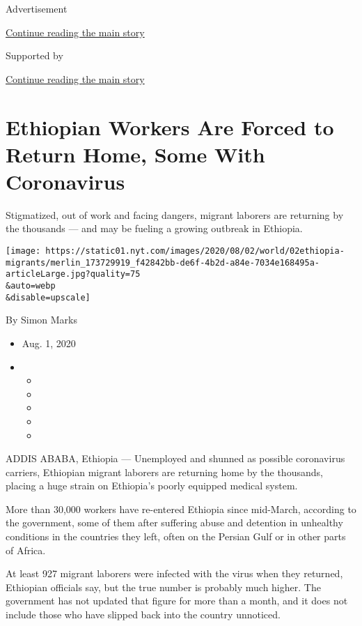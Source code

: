 Advertisement

\protect\hyperlink{after-top}{Continue reading the main story}

Supported by

\protect\hyperlink{after-sponsor}{Continue reading the main story}

\hypertarget{ethiopian-workers-are-forced-to-return-home-some-with-coronavirus}{%
\section{Ethiopian Workers Are Forced to Return Home, Some With
Coronavirus}\label{ethiopian-workers-are-forced-to-return-home-some-with-coronavirus}}

Stigmatized, out of work and facing dangers, migrant laborers are
returning by the thousands --- and may be fueling a growing outbreak in
Ethiopia.

\texttt{[image: https://static01.nyt.com/images/2020/08/02/world/02ethiopia-migrants/merlin\_173729919\_f42842bb-de6f-4b2d-a84e-7034e168495a-articleLarge.jpg?quality=75\\\&auto=webp\\\&disable=upscale]}

By Simon Marks

\begin{itemize}
\item
  Aug. 1, 2020
\item
  \begin{itemize}
  \item
  \item
  \item
  \item
  \item
  \end{itemize}
\end{itemize}

ADDIS ABABA, Ethiopia --- Unemployed and shunned as possible coronavirus
carriers, Ethiopian migrant laborers are returning home by the
thousands, placing a huge strain on Ethiopia's poorly equipped medical
system.

More than 30,000 workers have re-entered Ethiopia since mid-March,
according to the government, some of them after suffering abuse and
detention in unhealthy conditions in the countries they left, often on
the Persian Gulf or in other parts of Africa.

At least 927 migrant laborers were infected with the virus when they
returned, Ethiopian officials say, but the true number is probably much
higher. The government has not updated that figure for more than a
month, and it does not include those who have slipped back into the
country unnoticed.

